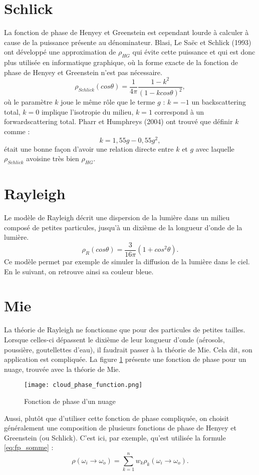 \section{Schlick}

La fonction de phase de Henyey et Greenstein est cependant lourde à calculer à cause de la puissance présente au dénominateur. Blasi, Le Saëc et Schlick (1993) ont développé une approximation de $\rho_{HG}$ qui évite cette puissance et qui est donc plus utilisée en informatique graphique, où la forme exacte de la fonction de phase de Henyey et Greenstein n'est pas nécessaire.
\large
$$\rho_{Schlick}(cos\theta) = \frac{1}{4\pi} \frac{1-k^2}{(1-kcos\theta)^2},$$
\normalsize
où le paramètre $k$ joue le même rôle que le terme $g$ : $k=-1$  un backscattering total, $k=0$ implique l'isotropie du milieu, $k=1$ correspond à un forwardscattering total. Pharr et Humphreys (2004) ont trouvé que définir $k$ comme :
\large
$$k = 1,55g-0,55g^2,$$
\normalsize
était une bonne façon d'avoir une relation directe entre $k$ et $g$ avec laquelle $\rho_{Schlick}$ avoisine très bien $\rho_{HG}$.

\section{Rayleigh}

Le modèle de Rayleigh décrit une dispersion de la lumière dans un milieu composé de petites particules, jusqu'à un dixième de la longueur d'onde de la lumière.
\large
$$\rho_{R}(cos\theta) = \frac{3}{16\pi}(1+cos^2\theta).$$
\normalsize
Ce modèle permet par exemple de simuler la diffusion de la lumière dans le ciel. En le suivant, on retrouve ainsi sa couleur bleue.


\section{Mie}

La théorie de Rayleigh ne fonctionne que pour des particules de petites tailles. Lorsque celles-ci dépassent le dixième de leur longueur d'onde (aérosols, poussière, goutellettes d'eau), il faudrait passer à la théorie de Mie. Cela dit, son application est compliquée. La figure \ref{fig:cloud_pf} présente une fonction de phase pour un nuage, trouvée avec la théorie de Mie.

\begin{figure}[h!]
\centering
\texttt{[image: cloud\_phase\_function.png]}
\caption{Fonction de phase d'un nuage}
\label{fig:cloud_pf}
\end{figure}

Aussi, plutôt que d'utiliser cette fonction de phase compliquée, on choisit généralement une composition de plusieurs fonctions de phase de Henyey et Greenstein (ou Schlick). C'est ici, par exemple, qu'est utilisée la formule \ref{eq:fp_somme} :
\large
$$\rho(\omega_{i}\longrightarrow\omega_{o}) = \sum\limits_{k=1}^n w_{k}\rho_{k}(\omega_{i}\longrightarrow\omega_{o}).$$
\normalsize